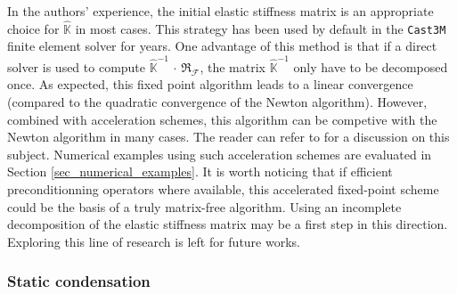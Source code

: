 In the authors' experience, the initial elastic stiffness matrix is an
appropriate choice for \(\hat{\mathbb{K}}\) in most cases. This strategy
has been used by default in the {\tt Cast3M} finite element solver for
years. One advantage of this method is that if a direct solver is used
to compute \(\hat{\mathbb{K}}^{-1}\,\cdot\,\mathfrak{R}_{\mathcal{F}}\),
the matrix \(\hat{\mathbb{K}}^{-1}\) only have to be decomposed once.
%
%
%
As expected, this fixed point algorithm leads to a linear convergence
(compared to the quadratic convergence of the Newton algorithm).
However, combined with acceleration schemes, this algorithm can be
competive with the Newton algorithm in many cases. The reader can refer to
\cite{ramiere_iterative_2015} for a discussion on this subject.
Numerical examples using such acceleration schemes are
evaluated in Section \ref{sec_numerical_examples}.
%
%
%
It is worth noticing that if efficient preconditionning operators
where available, this accelerated fixed-point scheme could be the basis
of a truly matrix-free algorithm. Using an incomplete decomposition of
the elastic stiffness matrix may be a first step in this direction.
Exploring this line of research is left for future works.

\subsubsection{Static condensation}
\label{sec_static_condesnation_scheme}

